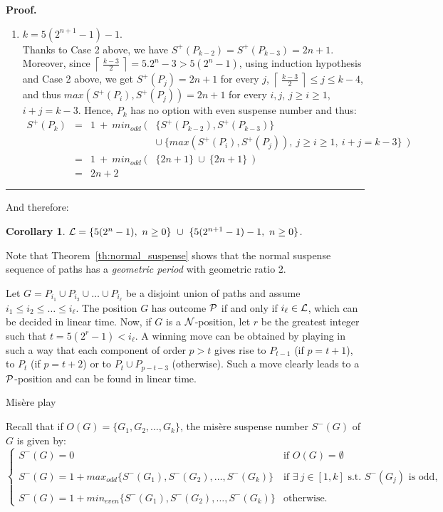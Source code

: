 \documentclass[11pt]{article}
\newcommand{\centre}[1]{\begin{center}#1\end{center}}
\newcommand{\NN}{{\cal N}}
\newcommand{\PP}{{\cal P}}
\newcommand{\LL}{{\cal L}}
\newcommand{\ceil}[1]{\left\lceil~#1~\right\rceil}
\newtheorem{corollary}[theorem]{Corollary}
\newcommand\qed{\mbox{}\hfill\rule{0.5em}{0.809em}\par\vskip 5mm}
\newenvironment{proof}[0]{\noindent\textbf{Proof.}}{\qed}
\begin{document}
\begin{proof}
\begin{enumerate}
\item $k=5(2^{n+1}-1)-1$.\\
Thanks to Case 2 above, we have $S^+(P_{k-2})=S^+(P_{k-3})=2n+1$.
Moreover, 
since $\ceil{\frac{k-3}{2}}=5.2^{n}-3>5(2^{n}-1)$, 
using induction hypothesis and Case 2 above, we get
$S^+(P_j)=2n+1$ for every $j$, $\ceil{\frac{k-3}{2}}\le j\le k-4$,
and thus $max(S^+(P_i),S^+(P_j))=2n+1$ for every $i,j$,
$j\ge i\ge 1$, $i+j=k-3$.
Hence, $P_k$ has no option
with even suspense number and thus:
$$
\begin{array}{rcll}
S^+(P_k) & = & 1\ +\ min_{odd}\ ( & \{ S^+(P_{k-2}),S^+(P_{k-3})\} \\
  & & & \cup\ \{ max(S^+(P_i),S^+(P_j)),\ j\ge i\ge 1,\ i+j=k-3\}\ \ )\\
  & = & 1\ +\ min_{odd}\ ( & \{2n+1\}\
   \cup\ \{2n+1\}\ \ )\\
  & =& 2n+2
\end{array}
$$

\end{enumerate}
\end{proof}

And therefore:

\begin{corollary}
$\LL=\{5(2^n-1),\ n\ge 0\}\ \cup\ \{5(2^{n+1}-1)-1,\ n\ge 0\}$.
\end {corollary}

Note that Theorem~\ref{th:normal_suspense} shows that the normal
suspense sequence of paths has a {\em geometric period} with
geometric ratio 2.

Let $G=P_{i_1}\cup P_{i_2}\cup\dots\cup P_{i_\ell}$ be a disjoint union
of paths and assume $i_1\le i_2\le\dots\le i_\ell$.
The position $G$ has outcome $\PP$ if and only if $i_\ell\in\LL$, which
can be decided in linear time.
Now, if $G$ is a $\NN$-position,
let $r$ be the greatest integer such that $t=5(2^r-1)<i_\ell$.
A winning move can be obtained by playing in such a way that each component of
order $p>t$ gives rise to $P_{t-1}$ (if $p=t+1$), to $P_t$ (if $p=t+2$)
or to $P_t\cup P_{p-t-3}$ (otherwise). Such a move clearly leads to a
$\PP$-position and can be found in linear time.

\vskip 4mm

\centre{{\sc Mis\`ere play}}


\noindent
Recall that if $O(G)=\{G_1,G_2,\dots,G_k\}$, the mis\`ere suspense number $S^-(G)$
of $G$ is given by:
$$\left\{
\begin{array}{ll}
 S^-(G)=0 & \mbox{if\ } O(G)=\emptyset \\
 \\
 S^-(G)=1+max_{odd}\{S^-(G_1),S^-(G_2),\dots,S^-(G_k)\} &
    \mbox{if $\exists\ j\in[1,k]$ s.t. $S^-(G_j)$ is odd,}\\
    \\
 S^-(G)=1+min_{even}\{S^-(G_1),S^-(G_2),\dots,S^-(G_k)\} &
   \mbox{otherwise.}
\end{array}
\right.$$
\end{document}
